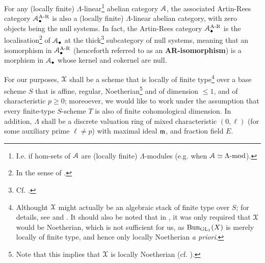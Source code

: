             \begin{proposition} \label{prop: artin_rees_categories_are_linear_and_abelian}
                \cite[Expos\'e V, Propositions 2.2.2 et 2.4.1]{sga5} For any (locally finite) $\Lambda$-linear\footnote{I.e. if hom-sets of $\mathcal{A}$ are (locally finite) $\Lambda$-modules (e.g. when $\mathcal{A} \simeq \Lambda\text{-}\mathrm{mod}$).} abelian category $\mathcal{A}$, the associated Artin-Rees category $\mathcal{A}_{\bullet}^{\mathrm{A\text{-}R}}$ is also a (locally finite) $\Lambda$-linear abelian category, with zero objects being the null systems. In fact, the Artin-Rees category $\mathcal{A}_{\bullet}^{\mathrm{A\text{-}R}}$ is the localisation\footnote{In the sense of \cite[\href{https://stacks.math.columbia.edu/tag/02MS}{Tag 02MS}]{stacks}.} of $\mathcal{A}_{\bullet}$ at the thick\footnote{Cf. \cite[\href{https://stacks.math.columbia.edu/tag/02MO}{Tag 02MO}]{stacks}.} subcategory of null systems, meaning that an isomorphism in $\mathcal{A}_{\bullet}^{\mathrm{A\text{-}R}}$ (henceforth referred to as an \textbf{AR-isomorphism}) is a morphism in $\mathcal{A}_{\bullet}$ whose kernel and cokernel are null. 
            \end{proposition}
            
            \begin{convention} \label{conv: l_adic_sheaves_conventions}
                For our purposes, $\mathcal{X}$ shall be a scheme that is locally of finite type\footnote{Althought $\mathcal{X}$ might actually be an algebraic stack of finite type over $S$; for details, see \cite{laszlo_olsson_adic_sheaves_on_artin_stacks_1} and \cite{laszlo_olsson_adic_sheaves_on_artin_stacks_2}. It should also be noted that in \cite[Subsection 1.4]{conrad_etale_cohomology}, it was only required that $\mathcal{X}$ would be Noetherian, which is not sufficient for us, as $\mathrm{Bun}_{\operatorname{GL}_1}(X)$ is merely locally of finite type, and hence only locally Noetherian \textit{a priori}.} over a base scheme $S$ that is affine, regular, Noetherian\footnote{Note that this implies that $\mathcal{X}$ is locally Noetherian (cf. \cite[\href{https://stacks.math.columbia.edu/tag/01T6}{Tag 01T6}]{stacks}).} and of dimension $\leq 1$, and of characteristic $p \geq 0$; moreoever, we would like to work under the assumption that every finite-type $S$-scheme $T$ is also of finite cohomological dimension. In addition, $\Lambda$ shall be a discrete valuation ring of mixed characteristic $(0, \ell)$ (for some auxiliary prime $\ell \not = p$) with maximal ideal $\mathfrak{m}$, and fraction field $E$.
            \end{convention}
            
